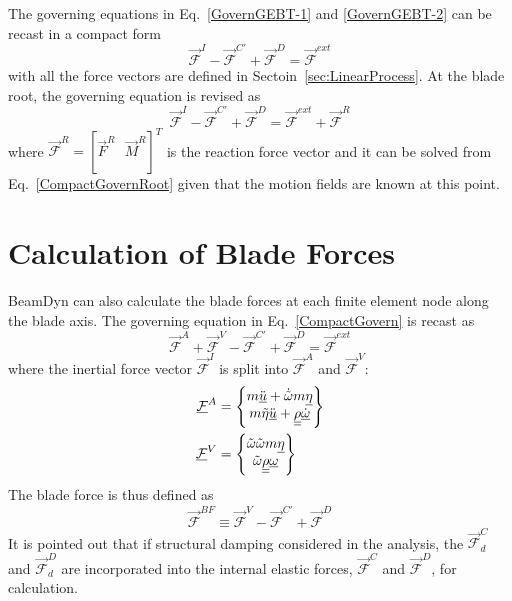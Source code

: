 The governing equations in Eq.~\ref{GovernGEBT-1} and \ref{GovernGEBT-2} can be recast in a compact form
\begin{equation}
    \label{CompactGovern}
    \vec{\mathcal{F}}^I - \vec{\mathcal{F}}^{C\prime} + \vec{\mathcal{F}}^D = \vec{\mathcal{F}}^{ext}
\end{equation}
with all the force vectors are defined in Sectoin~\ref{sec:LinearProcess}.  At the blade root, the governing equation is revised as
\begin{equation}
    \label{CompactGovernRoot}
    \vec{\mathcal{F}}^I - \vec{\mathcal{F}}^{C\prime} + \vec{\mathcal{F}}^D = \vec{\mathcal{F}}^{ext}+\vec{\mathcal{F}}^R
\end{equation}
where $\vec{\mathcal{F}}^R = \left[ \vec{F}^R~~~\vec{M}^R\right]^T$ is the reaction force vector and it can be solved from Eq.~\ref{CompactGovernRoot} given that the motion fields are known at this point.

\section{Calculation of Blade Forces}
BeamDyn can also calculate the blade forces at each finite element node along the blade axis. The governing equation in Eq.~\ref{CompactGovern} is recast as
\begin{equation}
    \label{GovernBF}
     \vec{\mathcal{F}}^A + \vec{\mathcal{F}}^V - \vec{\mathcal{F}}^{C\prime} + \vec{\mathcal{F}}^D = \vec{\mathcal{F}}^{ext}
\end{equation}
where the inertial force vector $\vec{\mathcal{F}}^I$ is split into $\vec{\mathcal{F}}^A$ and $\vec{\mathcal{F}}^V$:
\begin{align}
    \label{mathcalFA}
    \underline{\mathcal{F}}^A &= \begin{Bmatrix}
    m \ddot{\underline{u}} + \dot{\tilde{\omega}}m \underline{\eta}\\
    m \tilde{\eta} \ddot{\underline{u}} + \underline{\underline{\rho}} \dot{\underline{\omega}}
    \end{Bmatrix} \\
    \label{mathcalFV}
    \underline{\mathcal{F}}^V &= \begin{Bmatrix}
    \tilde{\omega} \tilde{\omega} m \underline{\eta}\\
     \tilde{\omega} \underline{\underline{\rho}} \underline{\omega}
    \end{Bmatrix} \\    
\end{align}
The blade force is thus defined as
\begin{equation}
    \label{BladeForce}
    \vec{\mathcal{F}}^{BF} \equiv \vec{\mathcal{F}}^V - \vec{\mathcal{F}}^{C\prime} + \vec{\mathcal{F}}^D
\end{equation}
It is pointed out that if structural damping considered in the analysis, the $\vec{\mathcal{F}}^{C}_d$ and $\vec{\mathcal{F}}^D_d$ are incorporated into the internal elastic forces, $\vec{\mathcal{F}}^C$ and $\vec{\mathcal{F}}^D$, for calculation.

